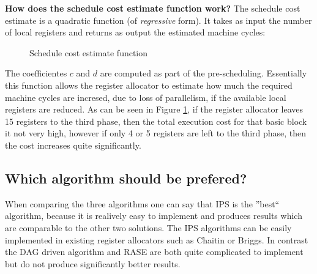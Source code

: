 \documentclass[a4paper,10pt]{article}
\begin{document}
\textbf{How does the schedule cost estimate function work?} The schedule cost estimate is a quadratic function (of \textit{regressive} form). It takes as input the number of local registers and returns as 
output the estimated machine cycles:
\begin{figure}[h!]
\begin{center}
\end{center}
\caption{Schedule cost estimate function}
\label{schedule-cost-estimate-function}
\end{figure}

The coefficientes $c$ and $d$ are computed as part of the pre-scheduling. Essentially this function allows the register allocator to 
estimate how much the required machine cycles are incresed, due to loss of parallelism, if the available local registers are reduced.
As can be seen in Figure \ref{schedule-cost-estimate-function}, if the register allocator leaves 15 registers to the third phase,
then the total execution cost for that basic block it not very high, however if only 4 or 5 registers are left to the third phase,
then the cost increases quite significantly.

\subsection{Which algorithm should be prefered?}
When comparing the three algorithms one can say that IPS is the ''best`` 
algorithm, because it is realively easy to implement and produces results which are comparable to the other two solutions. The IPS 
algorithms can be easily implemented in existing register allocators such as Chaitin or Briggs. In contrast the DAG driven algorithm and 
RASE are both quite complicated to implement but do not produce significantly better results.
\end{document}
